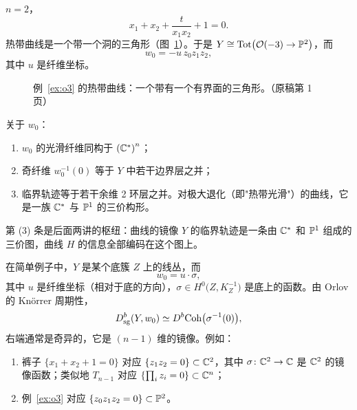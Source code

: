 \begin{example}[$\PP^2$ 中的三次曲线附近]\label{ex:o3}
$n=2$，
\[
x_1+x_2+\frac{t}{x_1x_2}+1=0 .
\]
热带曲线是一个带一个洞的三角形（图~\ref{fig:trop-o3}）。于是 $Y\cong\operatorname{Tot}\bigl(\mathcal{O}(-3)\to\mathbb{P}^2\bigr)$，而
\[
w_0=-u\,z_0z_1z_2 ,
\]
其中 $u$ 是纤维坐标。
\end{example}

\begin{figure}[htbp]
\centering
{}
\caption{例~\ref{ex:o3} 的热带曲线：一个带有一个有界面的三角形。（原稿第 1 页）}
\label{fig:trop-o3}
\end{figure}

\begin{remark}\label{rem:fib}
关于 $w_0$：
\begin{enumerate}[label=(\arabic*)]
  \item $w_0$ 的光滑纤维同构于 $\left(\mathbb{C}^*\right)^n$；
  \item 奇纤维 $w_0^{-1}(0)$ 等于 $Y$ 中若干边界层之并；
  \item 临界轨迹等于若干余维 2 环层之并。对极大退化（即"热带光滑"）的曲线，它是一族 $\mathbb{C}^*$ 与 $\mathbb{P}^1$ 的三价构形。
\end{enumerate}
\end{remark}

第 (3) 条是后面两讲的枢纽：曲线的镜像 $Y$ 的临界轨迹是一条由 $\mathbb{C}^*$ 和 $\mathbb{P}^1$ 组成的三价图，曲线 $H$ 的信息全部编码在这个图上。

\begin{remark}[线丛情形]\label{rem:linebundle}
在简单例子中，$Y$ 是某个底簇 $Z$ 上的线丛，而
\[
w_0=u\cdot\sigma ,
\]
其中 $u$ 是纤维坐标（相对于底的方向），$\sigma\in H^0\bigl(Z,K_Z^{-1}\bigr)$ 是底上的函数。由 Orlov 的 Knörrer 周期性，
\[
D^{b}_{\mathrm{sg}}(Y,w_0)\simeq D^{b}\mathrm{Coh}\bigl(\sigma^{-1}(0)\bigr),
\]
右端通常是奇异的，它是 $(n-1)$ 维的镜像。例如：
\begin{enumerate}[label=(\arabic*)]
  \item 裤子 $\{x_1+x_2+1=0\}$ 对应 $\{z_1z_2=0\}\subset\mathbb{C}^2$，其中 $\sigma\colon\mathbb{C}^2\to\mathbb{C}$ 是 $\mathbb{C}^2$ 的镜像函数；类似地 $T_{n-1}$ 对应 $\{\prod_i z_i=0\}\subset\mathbb{C}^n$；
  \item 例~\ref{ex:o3} 对应 $\{z_0z_1z_2=0\}\subset\mathbb{P}^2$。
\end{enumerate}
\end{remark}

